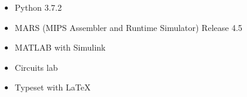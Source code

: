 
\begin{itemize}
	\item Python 3.7.2
	\item MARS (MIPS Assembler and Runtime Simulator) Release 4.5
	\item MATLAB with Simulink
	\item Circuits lab
	\item Typeset with \LaTeX
\end{itemize}